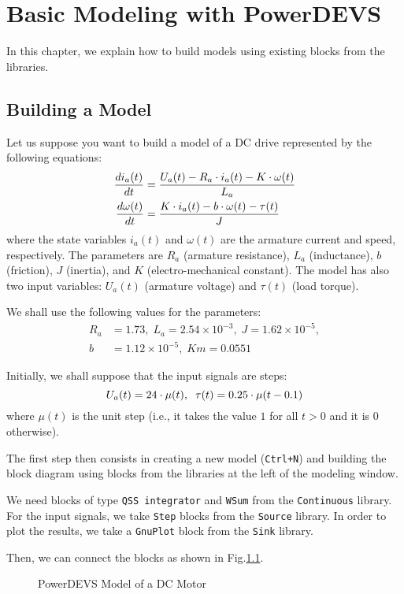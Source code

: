 \chapter{Basic Modeling with PowerDEVS}
In this chapter, we explain how to build models using existing blocks from the libraries.

\section{Building a Model}
Let us suppose you want to build a model of a DC drive represented by the following equations:
\begin{equation}\label{eq:motor}
  \begin{split}
   \frac{\displaystyle di_a(t)}{\displaystyle dt}&=\frac{U_a(t)-R_a\cdot i_a(t)-K\cdot \omega(t)}{L_a}\\
   \frac{\displaystyle d\omega(t)}{\displaystyle dt}&=\frac{K\cdot i_a(t)-b\cdot \omega(t)-\tau(t)}{J}\\
  \end{split}
\end{equation}
where the state variables $i_a(t)$ and $\omega(t)$ are the armature current and speed, respectively. The parameters are $R_a$ (armature resistance), $L_a$ (inductance), $b$ (friction), $J$ (inertia), and $K$ (electro-mechanical constant). The model has also two input variables: $U_a(t)$ (armature voltage) and $\tau(t)$ (load torque).

We shall use the following values for the parameters:
\begin{equation}
\begin{split}
 R_a&=1.73,\;L_a=2.54\times 10^{-3},\;J=1.62\times 10^{-5},\\
b&=1.12\times 10^{-5},\;Km=0.0551 
\end{split}
\end{equation}

Initially, we shall suppose that the input signals are steps:
\begin{equation}
 U_a(t)=24\cdot \mu(t),\;\;\tau(t)=0.25\cdot \mu(t-0.1)
\end{equation}
where $\mu(t)$ is the unit step (i.e., it takes the value $1$ for all $t>0$ and it is $0$ otherwise).

The first step then consists in creating a new model (\verb"Ctrl+N") and building the block diagram using blocks from the libraries at the left of the modeling window.

We need blocks of type \verb"QSS integrator" and \verb"WSum" from the \verb"Continuous" library. For the input signals, we take \verb"Step" blocks from the \verb"Source" library. In order to plot the results, we take a \verb"GnuPlot" block from the \verb"Sink" library.

Then, we can connect the blocks as shown in Fig.\ref{fig:db_motor}.

\begin{figure}[h]
 \caption{PowerDEVS Model of a DC Motor}
 \label{fig:db_motor}

\end{figure}






